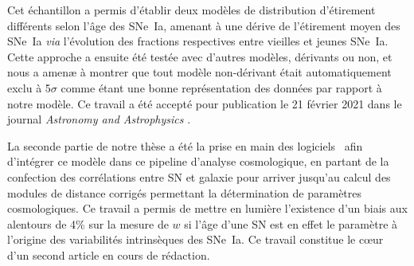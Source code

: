 \documentclass[../main/main.tex]{subfiles}
\begin{document}
Cet échantillon a permis d'établir deux modèles de distribution d'étirement
différents selon l'âge des SNe~Ia, amenant à une dérive de l'étirement moyen des
SNe~Ia \textit{via} l'évolution des fractions respectives entre vieilles et
jeunes SNe~Ia. Cette approche a ensuite été testée avec d'autres modèles,
dérivants ou non, et nous a amenæ à montrer que tout modèle non-dérivant était
automatiquement exclu à 5$\sigma$ comme étant une bonne représentation des
données par rapport à notre modèle. Ce travail a été accepté pour publication le
21 février 2021 dans le journal \textit{Astronomy and Astrophysics}
\citep{nicolas2021}.

La seconde partie de notre thèse a été la prise en main des logiciels \snana\
afin d'intégrer ce modèle dans ce pipeline d'analyse cosmologique, en partant de
la confection des corrélations entre SN et galaxie pour arriver jusqu'au calcul
des modules de distance corrigés permettant la détermination de paramètres
cosmologiques. Ce travail a permis de mettre en lumière l'existence d'un biais
aux alentours de 4\% sur la mesure de $w$ si l'âge d'une SN est en effet le
paramètre à l'origine des variabilités intrinsèques des SNe~Ia. Ce travail
constitue le cœur d'un second article en cours de rédaction.
\end{document}
